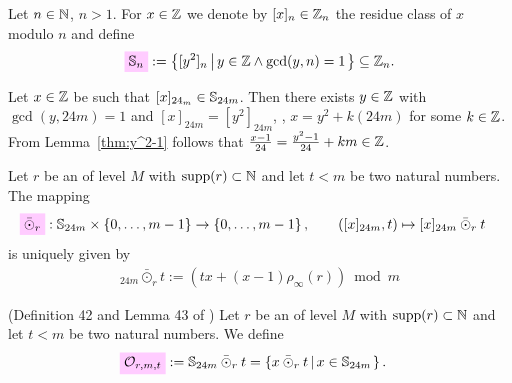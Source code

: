 \documentclass{article}
\begin{document}
\begin{Definition}\cite[Def.~40]{Radu_RamanujanKolberg_2015}
  Let $n \in \mathbb{N}$, $n>1$. For $x \in \mathbb{Z}$ we denote by
  $[x]_n\in \mathbb{Z}_n$ the residue class of $x$ modulo $n$ and define
  \begin{gather*}
    \defineNotation[S-n]{\setS_{n}}
    :=
    \SetDef{[y^2]_n}{y \in \setZ \land \gcd(y, n)=1}
    \subseteq
    \setZ_n.
  \end{gather*}
\end{Definition}

\begin{AdditionalInformation}
Let $x \in \mathbb{Z}$ be such that $[x]_{24_m} \in \mathbb{S}_{24m}$. Then
there exists $y \in \mathbb{Z}$ with $\gcd(y, 24m)=1$ and
$[x]_{24m}=[y^2]_{24m}$, \ie, $x = y^2 + k (24m)$ for some $k\in
\mathbb{Z}$. From Lemma~\ref{thm:y^2-1} follows that
$\frac{x-1}{24}=\frac{y^2-1}{24} + km \in\mathbb{Z}$.
\end{AdditionalInformation}

\begin{Definition}\cite[Def.~41]{Radu_RamanujanKolberg_2015}
  Let $r$ be an  of level $M$ with
  $\operatorname{supp}(r) \subset \mathbb{N}$ and let $t<m$ be two natural numbers.
  The mapping
  \begin{align*}
    \defineNotation[odotbar-r]{\bar{\odot}_r}
    &: \setS_{24m} \times \Set{0,\ldots,m-1} \to \Set{0,\ldots,m-1},
    \qquad
    ([x]_{24m}, t) \mapsto [x]_{24m}  \mathbin{\bar{\odot}_r} t
  \end{align*}
  is uniquely given by
  \begin{gather}
    [x]_{24m} \mathbin{\bar{\odot}_r} t
    :=
    \left( t x + (x-1) \rho_\infty(r) \right) \bmod{m}
  \end{gather}
\end{Definition}

\begin{Definition}
  \label{def:modularOrbit}
  (Definition 42 and Lemma 43 of \cite{Radu_RamanujanKolberg_2015})
  Let $r$ be an  of level $M$ with
  $\operatorname{supp}(r) \subset \mathbb{N}$ and let $t<m$ be two natural numbers.
%
  We define
  \begin{align}
    \defineNotation[O-r-m-t]{\modularOrbit{r,m,t}}
    &:=
      \setS_{24m}  \mathbin{\bar{\odot}_r} t
      =
      \SetDef{x \mathbin{\bar{\odot}_r} t}{x \in \setS_{24m}}.
  \end{align}
\end{Definition}
\end{document}
